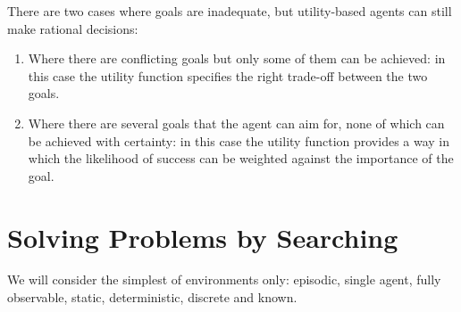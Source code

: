 \documentclass{article}
\begin{document}
There are two cases where goals are inadequate, but utility-based agents can still make rational decisions:
\begin{enumerate}
    \item Where there are conflicting goals but only some of them can be achieved: in this case the utility function specifies the right trade-off between the two goals.
    \item Where there are several goals that the agent can aim for, none of which can be achieved with certainty: in this case the utility function provides a way in which the likelihood of success can be weighted against the importance of the goal.
\end{enumerate}

\newpage
\section{Solving Problems by Searching}
We will consider the simplest of environments only: episodic, single agent, fully observable, static, deterministic, discrete and known.
\end{document}
